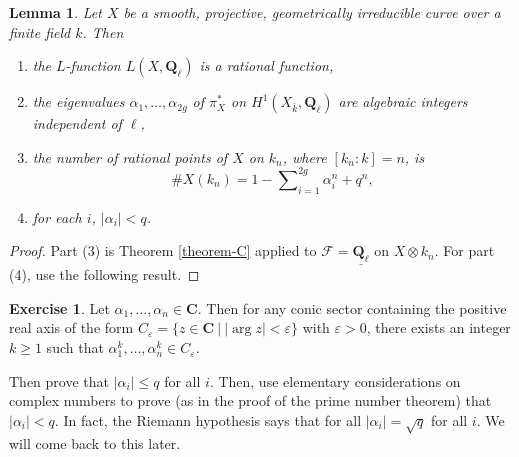 \documentclass{stacks-project}
\theoremstyle{plain}
\newtheorem{lemma}[subsection]{Lemma}
\theoremstyle{definition}
\newtheorem{exercise}[subsection]{Exercise}
\theoremstyle{remark}
\numberwithin{equation}{subsection}
\begin{document}
\begin{lemma}
\label{lemma-count-points-projective}
Let $X$ be a smooth, projective, geometrically irreducible
curve over a finite field $k$. Then
\begin{enumerate}
\item the $L$-function $L(X, \mathbf{Q}_\ell)$ is a rational function,
\item the eigenvalues $\alpha_1, \ldots, \alpha_{2g}$ of $\pi_X^*$ on
$H^1(X_{\bar k}, \mathbf{Q}_\ell)$ are algebraic integers
independent of $\ell$,
\item the number of rational points of $X$ on $k_n$, where $[k_n : k] = n$, is
$$
\# X(k_n) = 1 - \sum\nolimits_{i = 1}^{2g}\alpha_i^n + q^n,
$$
\item for each $i$, $|\alpha_i| < q$.
\end{enumerate}
\end{lemma}

\begin{proof}
Part (3) is Theorem \ref{theorem-C} applied to $\mathcal{F} =
\underline{\mathbf{Q}_\ell}$ on $X \otimes k_n$. For part (4), use the
following result.
\end{proof}

\begin{exercise}
\label{exercise-powers}
Let $\alpha_1, \ldots, \alpha_n \in \mathbf{C}$. Then for any conic sector
containing the positive real axis of the form $C_\varepsilon = \{ z \in
\mathbf{C} \ | \ |\arg z| < \varepsilon \}$ with $\varepsilon > 0$, there exists
an integer $k \geq 1$ such that $\alpha_1^k, \ldots, \alpha_n^k \in
C_\varepsilon$.
\end{exercise}

\noindent
Then prove that $|\alpha_i| \leq q$ for all $i$. Then, use elementary
considerations on complex numbers to prove (as in the proof of the prime number
theorem) that $|\alpha_i| < q$. In fact, the Riemann hypothesis says that for
all $|\alpha_i| = \sqrt{q}$ for all $i$. We will come back to this later.
\end{document}
